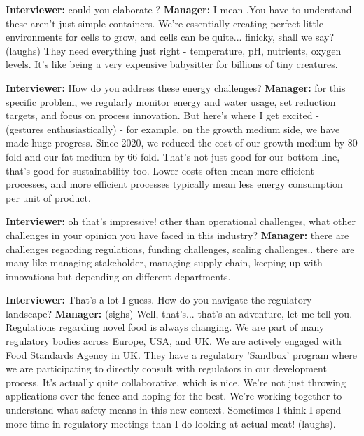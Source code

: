 \textbf{Interviewer:}  could you elaborate ?\newline
\textbf{Manager:} I mean .You have to understand - these aren't just simple containers. We're essentially creating perfect little environments for cells to grow, and cells can be quite... finicky, shall we say? (laughs) They need everything just right - temperature, pH, nutrients, oxygen levels. It's like being a very expensive babysitter for billions of tiny creatures. \newline

\textbf{Interviewer:} How do you address these energy challenges?\newline
\textbf{Manager:} for this specific problem, we regularly monitor energy and water usage, set reduction targets, and focus on process innovation. But here's where I get excited - (gestures enthusiastically) - for example, on the growth medium side, we have made huge progress. Since 2020, we reduced the cost of our growth medium by 80 fold and our fat medium by 66 fold. That's not just good for our bottom line, that's good for sustainability too. Lower costs often mean more efficient processes, and more efficient processes typically mean less energy consumption per unit of product.\newline

\textbf{Interviewer:} oh that's impressive! other than operational challenges, what other challenges in your opinion you have faced in this industry?\newline
\textbf{Manager:} there are challenges regarding regulations, funding challenges, scaling challenges.. there are many like managing stakeholder, managing supply chain, keeping up with innovations but depending on different departments.\newline 

\textbf{Interviewer:} That's a lot I guess. How do you navigate the regulatory landscape?\newline
\textbf{Manager:} (sighs) Well, that's... that's an adventure, let me tell you. Regulations regarding novel food is always changing. We are part of many regulatory bodies across Europe, USA, and UK. We are actively engaged with Food Standards Agency in UK. They have a regulatory 'Sandbox' program where we are participating to directly consult with regulators in our development process. It's actually quite collaborative, which is nice. We're not just throwing applications over the fence and hoping for the best. We're working together to understand what safety means in this new context. Sometimes I think I spend more time in regulatory meetings than I do looking at actual meat! (laughs). \newline

